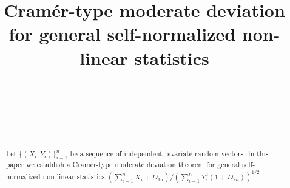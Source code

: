 \documentclass[bj,authoryear]{imsart}
\numberwithin{equation}{section}
\theoremstyle{plain}
\theoremstyle{definition}
\begin{document}
\begin{frontmatter}
\title{Cram\'{e}r-type moderate deviation for general self-normalized non-linear statistics}

\begin{aug}
\author[A]{~}
\author[B]{~}
\author[B]{~}
\address[A]{School of Mathematical Sciences, Dalian University of Technology, Dalian, Liaoning, China}
\address[B]{Department of Statistics and Data Science, Shenzhen International Center for Mathematics, Southern University of Science and Technology, Shenzhen, Guangdong, 518055, China}
\address[B]{Department of Statistics and Data Science, Southern University of Science and Technology, Shenzhen, Guangdong, 518055, China}
\end{aug}

\begin{abstract}
Let $\{(X_i,Y_i)\}_{i = 1}^{n}$ be a sequence of independent bivariate random vectors. In this paper we establish a Cram\'{e}r-type moderate deviation theorem for general self-normalized non-linear statistics $(\sum_{i = 1}^{n}X_i + D_{1n})/(\sum_{i = 1}^{n}Y_i^2(1+D_{2n}))^{1/2}$
\end{abstract}

\begin{keyword}
\end{keyword}

\end{frontmatter}
\end{document}
